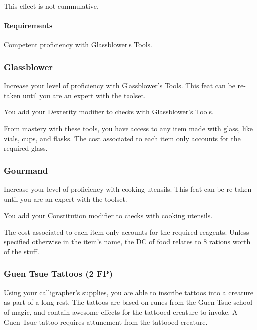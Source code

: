     This effect is not cummulative.
    \paragraph{Requirements} Competent proficiency with Glassblower's Tools.
\subsubsection{Glassblower} \label{feat::glassblower}
    Increase your level of proficiency with Glassblower's Tools.
    This feat can be re-taken until you are an expert with the toolset.

    You add your Dexterity modifier to checks with Glassblower's Tools.

    From mastery with these tools, you have access to any item made with glass, like vials, cups, and flasks.
    The cost associated to each item only accounts for the required glass.

\subsubsection{Gourmand} \label{feat::gourmand}
    Increase your level of proficiency with cooking utensils.
    This feat can be re-taken until you are an expert with the toolset.

    You add your Constitution modifier to checks with cooking utensils.

    The cost associated to each item only accounts for the required reagents.
    Unless specified otherwise in the item's name, the DC of food relates to 8 rations worth of the stuff.
\subsubsection{Guen Tsue Tattoos (2 FP)} \label{feat::guentsuetattoos}
    Using your calligrapher's supplies, you are able to inscribe tattoos into a creature as part of a long rest.
    The tattoos are based on runes from the Guen Tsue school of magic, and contain awesome effects for the tattooed creature to invoke.
    A Guen Tsue tattoo requires attunement from the tattooed creature.

